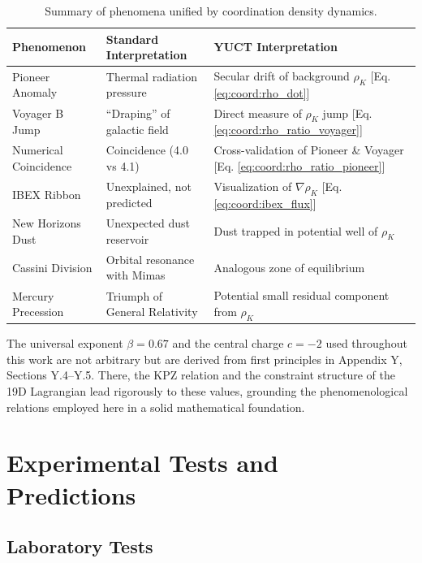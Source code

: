\documentclass[12pt,a4paper]{article}
\theoremstyle{remark}
\begin{document}
	\begin{table}[htbp]
		\centering
		\caption{Summary of phenomena unified by coordination density dynamics.}
		\label{tab:coord:summary}
		\begin{tabular}{|p{4.5cm}|p{4.5cm}|p{5cm}|}
			\hline
			\textbf{Phenomenon} & \textbf{Standard Interpretation} & \textbf{YUCT Interpretation} \\
			\hline
			Pioneer Anomaly & Thermal radiation pressure & Secular drift of background \(\rho_K\) [Eq. \ref{eq:coord:rho_dot}] \\
			\hline
			Voyager B Jump & ``Draping'' of galactic field & Direct measure of \(\rho_K\) jump [Eq. \ref{eq:coord:rho_ratio_voyager}] \\
			\hline
			Numerical Coincidence & Coincidence (4.0 vs 4.1) & Cross-validation of Pioneer \& Voyager [Eq. \ref{eq:coord:rho_ratio_pioneer}] \\
			\hline
			IBEX Ribbon & Unexplained, not predicted & Visualization of \(\nabla \rho_K\) [Eq. \ref{eq:coord:ibex_flux}] \\
			\hline
			New Horizons Dust & Unexpected dust reservoir & Dust trapped in potential well of \(\rho_K\) \\
			\hline
			Cassini Division & Orbital resonance with Mimas & Analogous zone of equilibrium  \\
			\hline
			Mercury Precession & Triumph of General Relativity & Potential small residual component from \(\rho_K\) \\
			\hline
		\end{tabular}
	\end{table}
	
	The universal exponent \(\beta = 0.67\) and the central charge \(c = -2\) used throughout this work are not arbitrary but are derived from first principles in Appendix Y, Sections Y.4–Y.5. There, the KPZ relation and the constraint structure of the 19D Lagrangian lead rigorously to these values, grounding the phenomenological relations employed here in a solid mathematical foundation.
	
	\section{Experimental Tests and Predictions}
	\label{sec:experimental-tests}
	
	\subsection{Laboratory Tests}
	
\end{document}
